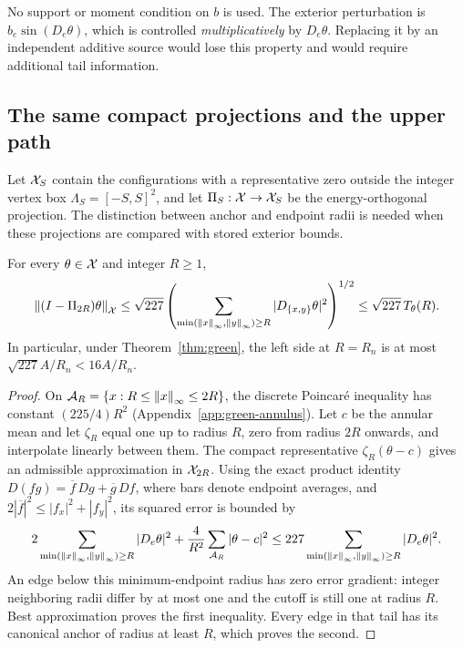 \begin{remark}
No support or moment condition on $b$ is used.  The exterior perturbation
is $b_e\sin(D_e\theta)$, which is controlled \emph{multiplicatively} by
$D_e\theta$.  Replacing it by an independent additive source would lose
this property and would require additional tail information.
\end{remark}

\subsection{The same compact projections and the upper path}

Let $\mathcal X_S$ contain the configurations with a representative zero outside
the integer vertex box $\Lambda_S=[-S,S]^2$, and let
$\Pi_S:\mathcal X\to\mathcal X_S$ be the energy-orthogonal projection.
The distinction between anchor and endpoint radii is needed when these
projections are compared with stored exterior bounds.

\begin{lemma}
\label{lem:green-projection}
For every $\theta\in\mathcal X$ and integer $R\ge1$,
\begin{equation}
 \left\lVert(I-\Pi_{2R})\theta\right\rVert_\mathcal X
 \le\sqrt{227}
 \left(\sum_{\min(\left\lVert x\right\rVert_\infty,\left\lVert y\right\rVert_\infty)\ge R}
                   |D_{\{x,y\}}\theta|^2\right)^{1/2}
 \le\sqrt{227}\,T_\theta(R).
 \label{eq:green-projection}
\end{equation}
In particular, under Theorem~\ref{thm:green}, the left side at $R=R_n$
is at most $\sqrt{227}A/R_n<16A/R_n$.
\end{lemma}

\begin{proof}
On $\mathcal A_R=\{x:R\le\left\lVert x\right\rVert_\infty\le2R\}$, the discrete
Poincar\'e inequality has constant $(225/4)R^2$
(Appendix~\ref{app:green-annulus}).  Let $c$ be the annular mean and let
$\zeta_R$ equal one up to radius $R$, zero from radius $2R$ onwards,
and interpolate linearly between them.  The compact representative
$\zeta_R(\theta-c)$ gives an admissible approximation in $\mathcal X_{2R}$.
Using the exact product identity
$D(fg)=\overline f\,Dg+\overline g\,Df$, where bars denote endpoint
averages, and
$2|\overline f|^2\le|f_x|^2+|f_y|^2$, its squared error is bounded by
\[
 2\sum_{\min(\left\lVert x\right\rVert_\infty,\left\lVert y\right\rVert_\infty)\ge R}|D_e\theta|^2
 +\frac4{R^2}\sum_{\mathcal A_R}|\theta-c|^2
 \le227\sum_{\min(\left\lVert x\right\rVert_\infty,\left\lVert y\right\rVert_\infty)\ge R}|D_e\theta|^2.
\]
An edge below this minimum-endpoint radius has zero error gradient:
integer neighboring radii differ by at most one and the cutoff is still
one at radius $R$.  Best approximation proves the first inequality.
Every edge in that tail has its canonical anchor of radius at least $R$,
which proves the second.
\end{proof}

